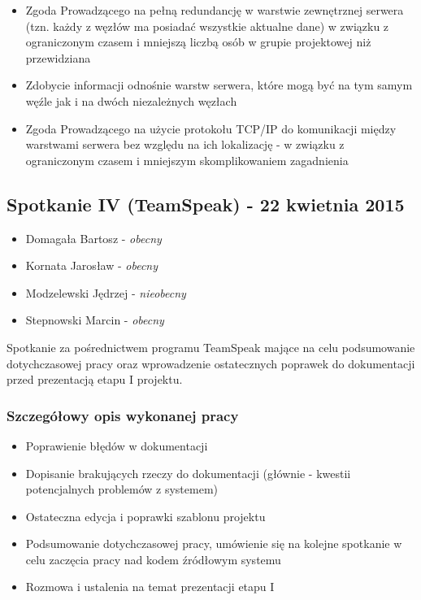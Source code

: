 \begin{itemize}
\item Zgoda Prowadzącego na pełną redundancję w warstwie zewnętrznej serwera (tzn. każdy z węzłów ma posiadać wszystkie aktualne dane) w związku z ograniczonym czasem i mniejszą liczbą osób w grupie projektowej niż przewidziana
\item Zdobycie informacji odnośnie warstw serwera, które mogą być na tym samym węźle jak i na dwóch niezależnych węzłach
\item Zgoda Prowadzącego na użycie protokołu TCP/IP do komunikacji między warstwami serwera bez względu na ich lokalizację - w związku z ograniczonym czasem i mniejszym skomplikowaniem zagadnienia
\end{itemize}

\subsection[Spotkanie IV - 22 kwietnia 2015]{Spotkanie IV (TeamSpeak) - 22 kwietnia 2015}

\begin{itemize}
\item Domagała Bartosz - \textit{obecny}
\item Kornata Jarosław - \textit{obecny}
\item Modzelewski Jędrzej - \textit{nieobecny}
\item Stepnowski Marcin - \textit{obecny}
\end{itemize}

\par{Spotkanie za pośrednictwem programu TeamSpeak mające na celu podsumowanie dotychczasowej pracy oraz wprowadzenie ostatecznych poprawek do dokumentacji przed prezentacją etapu I projektu.}

\subsubsection*[Szczegółowy opis wykonanej pracy]{Szczegółowy opis wykonanej pracy}
\begin{itemize}
\item Poprawienie błędów w dokumentacji
\item Dopisanie brakujących rzeczy do dokumentacji (głównie - kwestii potencjalnych problemów z systemem)
\item Ostateczna edycja i poprawki szablonu projektu
\item Podsumowanie dotychczasowej pracy, umówienie się na kolejne spotkanie w celu zaczęcia pracy nad kodem źródłowym systemu
\item Rozmowa i ustalenia na temat prezentacji etapu I
\end{itemize}

